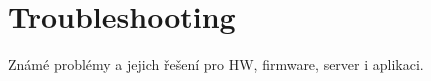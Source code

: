\chapter{Troubleshooting}
\label{app:troubleshooting}

Známé problémy a jejich řešení pro HW, firmware, server i aplikaci.
